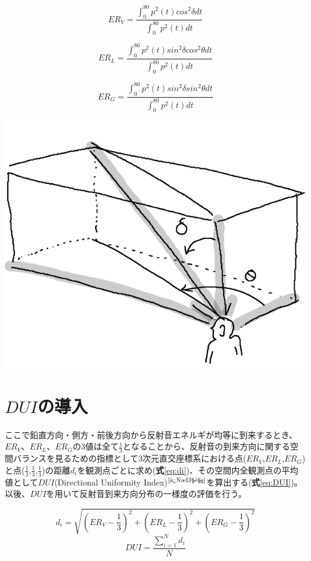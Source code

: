 \begin{table}[htbp]
\begin{equation}
  \label{eq:ERV}
  ER_V = {\frac{\displaystyle\int_0^{80}p^2(t)cos^2{\delta}dt}{\displaystyle\int_0^{80}p^2(t)dt}} 
\end{equation}

\begin{equation}
  \label{eq:ERL}
  ER_L = {\frac{\displaystyle\int_0^{80}p^2(t)sin^2{\delta}cos^2{\theta}dt}{\displaystyle\int_0^{80}p^2(t)dt}} 
\end{equation}

\begin{equation}
  \label{eq:ERG}
  ER_G = {\frac{\displaystyle\int_0^{80}p^2(t)sin^2{\delta}sin^2{\theta}dt}{\displaystyle\int_0^{80}p^2(t)dt}} 
\end{equation}

\centering
\includegraphics[keepaspectratio,scale=1]{04_att/direction.png}
\label{fig:}
\end{table}

\pagebreak
\section{$DUI$の導入}
ここで鉛直方向・側方・前後方向から反射音エネルギが均等に到来するとき、$ER_V$、$ER_L$、$ER_G$の3値は全て$\frac{1}{3}$となることから、反射音の到来方向に関する空間バランスを見るための指標として3次元直交座標系における点($ER_V$,$ER_L$,$ER_G$)と点($\frac{1}{3}$,$\frac{1}{3}$,$\frac{1}{3}$)の距離$d_i$を観測点ごとに求め(\textbf{式}\ref{eq:di})、その空間内全観測点の平均値として$DUI$(Directional Uniformity Index)$^{\text{\cite{後期音}}}$を算出する(\textbf{式}\ref{eq:DUI})。以後、$DUI$を用いて反射音到来方向分布の一様度の評価を行う。
\begin{table}[htbp]
\begin{equation}
  \label{eq:di}
  d_i = \sqrt{\left({ER_V-\frac{1}{3}}\right)^2 + \left(ER_L-\frac{1}{3}\right)^2 + \left(ER_G-\frac{1}{3}\right)^2} 
\end{equation}
\begin{equation}
    \label{eq:DUI}
    DUI=\frac{\sum_{i=1}^N{d_i}}{N}
\end{equation}
\end{table}

